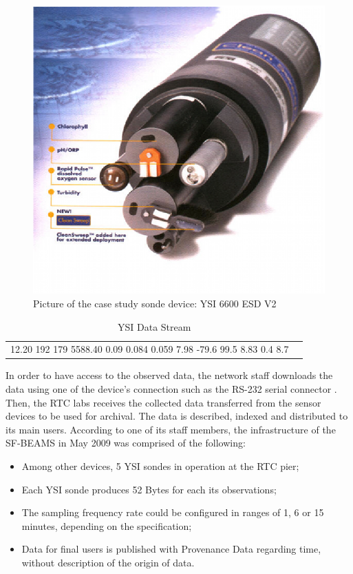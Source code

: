 \begin{figure}[!b]
  \centering
  \includegraphics[scale=0.7]{../diagrams/ysi-device}
  \caption{Picture of the case study sonde device: YSI 6600 ESD V2}
  \label{fig:ysi-device}
\end{figure}

\begin{table}
    \caption{YSI Data Stream}
    \begin{center}
        \begin{tabular}{lr}
  12.20    192    179 5588.40   0.09   0.084   0.059  7.98   -79.6   99.5  8.83 
  0.4     8.7
        \end{tabular}
    \end{center}
    \label{tab:ysi-data-stream}
\end{table}

In order to have access to the observed data, the network staff downloads the
data using one of the device's connection such as the RS-232 serial connector
\cite{rs232}. Then, the RTC labs receives the collected data transferred from
the sensor devices to be used for archival. The data is described, indexed and
distributed to its main users. According to one of its staff members, the
infrastructure of the SF-BEAMS in May 2009 was comprised of the following:

\begin{itemize}
  \item Among other devices, 5 YSI sondes in operation at the RTC pier;
  \item Each YSI sonde produces 52 Bytes for each its observations;
  \item The sampling frequency rate could be configured in ranges of 1, 6 or
  15 minutes, depending on the specification;
  \item Data for final users is published with Provenance Data regarding time,
  without description of the origin of data.
\end{itemize}

